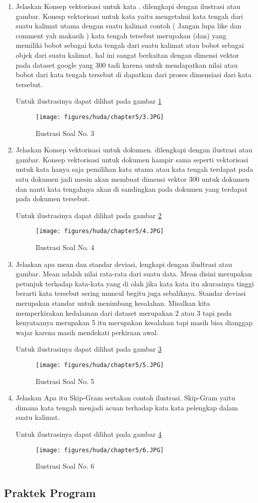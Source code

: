 \begin{enumerate}
\item Jelaskan Konsep vektorisasi untuk kata . dilengkapi dengan ilustrasi atau gambar.
\subitem Konesp vektorisasi untuk kata yaitu mengetahui kata tengah dari suatu kalimat utama dengan suatu kalimat contoh ( Jangan lupa like dan comment yah makasih ) kata tengah tersebut merupakan (dan) yang memiliki bobot sebagai kata tengah dari suatu kalimat atau bobot sebagai objek dari suatu kalimat. hal ini sangat berkaitan dengan dimensi vektor pada dataset google yang 300 tadi karena untuk mendapatkan nilai atau bobot dari kata tengah tersebut di dapatkan dari proses dimensiasi dari kata tersebut. 
\par Untuk ilustrasinya dapat dilihat pada gambar \ref{c5_3}
\begin{figure}[ht]
	\centerline{\texttt{[image: figures/huda/chapter5/3.JPG]}}
	\caption{Ilustrasi Soal No. 3}
	\label{c5_3}
\end{figure}
\item Jelaskan Konsep vektorisasi untuk dokumen. dilengkapi dengan ilustrasi atau gambar.
\subitem Konsep vektorisasi untuk dokumen hampir sama seperti vektorisasi untuk kata hanya saja pemilihan kata utama atau kata tengah terdapat pada satu dokumen jadi mesin akan membuat dimensi vektor 300 untuk dokumen dan nanti kata tengahnya akan di sandingkan pada dokumen yang terdapat pada dokumen tersebut.
\par Untuk ilustrasinya dapat dilihat pada gambar \ref{c5_4}
\begin{figure}[ht]
	\centerline{\texttt{[image: figures/huda/chapter5/4.JPG]}}
	\caption{Ilustrasi Soal No. 4}
	\label{c5_4}
\end{figure}
\item Jelaskan apa mean dan standar deviasi, lengkapi dengan iludtrasi atau gambar.
\subitem Mean adalah nilai rata-rata dari suatu data. Mean disini merupakan petunjuk terhadap kata-kata yang di olah jika kata kata itu akurasinya tinggi berarti kata tersebut sering muncul begitu juga sebaliknya. Standar deviasi merupakan standar untuk menimbang kesalahan. Misalkan kita memperkirakan kedalaman dari dataset merupakan 2 atau 3 tapi pada kenyataanya merupakan 5 itu merupakan kesalahan tapi masih bisa dianggap wajar karena masih mendekati perkiraan awal.
\par Untuk ilustrasinya dapat dilihat pada gambar \ref{c5_5}
\begin{figure}[ht]
	\centerline{\texttt{[image: figures/huda/chapter5/5.JPG]}}
	\caption{Ilustrasi Soal No. 5}
	\label{c5_5}
\end{figure}
\item Jelaskan Apa itu Skip-Gram sertakan contoh ilustrasi.
\subitem Skip-Gram yaitu dimana kata tengah menjadi acuan terhadap kata kata pelengkap dalam suatu kalimat.
\par Untuk ilustrasinya dapat dilihat pada gambar \ref{c5_6}
\begin{figure}[ht]
	\centerline{\texttt{[image: figures/huda/chapter5/6.JPG]}}
	\caption{Ilustrasi Soal No. 6}
	\label{c5_6}
\end{figure}
\end{enumerate}

\subsection{Praktek Program}